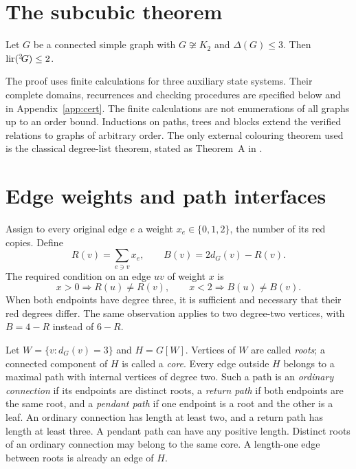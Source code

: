 \section{The subcubic theorem}\label{sec:subcubic}
\begin{theorem}\label{thm:main}
Let $G$ be a connected simple graph with $G\not\cong K_2$ and
$\Delta(G)\le3$.  Then $\operatorname{lir}({}^{2}\!G)\le2$.
\end{theorem}

The proof uses finite calculations for three auxiliary state systems.
Their complete domains, recurrences and checking procedures are specified
below and in Appendix~\ref{app:cert}.  The finite calculations are not
enumerations of all graphs up to an order bound.  Inductions on paths,
trees and blocks extend the verified relations to graphs of arbitrary
order.  The only external colouring theorem used is the classical
degree-list theorem, stated as Theorem~A in \cite{CR17}.

\section{Edge weights and path interfaces}\label{sec:path}

Assign to every original edge $e$ a weight $x_e\in\{0,1,2\}$, the number
of its red copies.  Define
\begin{equation}\label{eq:actual}
 R(v)=\sum_{e\ni v}x_e,\qquad B(v)=2d_G(v)-R(v).
\end{equation}
The required condition on an edge $uv$ of weight $x$ is
\begin{equation}\label{eq:rule}
 x>0\Longrightarrow R(u)\ne R(v),\qquad
 x<2\Longrightarrow B(u)\ne B(v).
\end{equation}
When both endpoints have degree three, it is sufficient and necessary
that their red degrees differ.  The same observation applies to two
degree-two vertices, with $B=4-R$ instead of $6-R$.

Let $W=\{v:d_G(v)=3\}$ and $H=G[W]$.  Vertices of $W$ are called
\emph{roots}; a connected component of $H$ is called a \emph{core}.
Every edge outside $H$ belongs to a maximal path with internal vertices of
degree two.  Such a path is an \emph{ordinary connection} if its endpoints
are distinct roots, a \emph{return path} if both endpoints are the same
root, and a \emph{pendant path} if one endpoint is a root and the other is
a leaf.  An ordinary connection has length at least two, and a return
path has length at least three.  A pendant path can have any positive
length.  Distinct roots of an ordinary connection may belong to the same
core.  A length-one edge between roots is already an edge of $H$.

